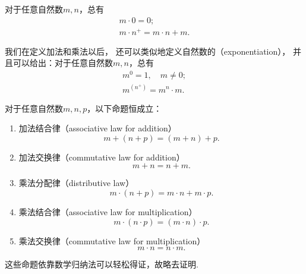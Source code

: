 \begin{theorem}
对于任意自然数\(m,n\)，总有\begin{gather}
	m \cdot 0 = 0;
	\label{equation:集合论.自然数的乘法.性质1} \\%
	m \cdot n^+ = m \cdot n + m.
	\label{equation:集合论.自然数的乘法.性质2}%
\end{gather}
\end{theorem}

我们在定义加法和乘法以后，
还可以类似地定义自然数的（exponentiation），
并且可以给出：对于任意自然数\(m,n\)，总有\begin{gather}
	m^0 = 1, \quad m \neq 0;
	\label{equation:集合论.自然数的乘幂.性质1} \\%
	m^{(n^+)} = m^n \cdot m.
	\label{equation:集合论.自然数的乘幂.性质2}%
\end{gather}

\begin{theorem}
对于任意自然数\(m,n,p\)，以下命题恒成立：
\begin{enumerate}
	\item 加法结合律（associative law for addition）
	\begin{equation}\label{equation:集合论.自然数加法结合律}
		m+(n+p)=(m+n)+p.
	\end{equation}
	\item 加法交换律（commutative law for addition）
	\begin{equation}\label{equation:集合论.自然数加法交换律}
		m+n=n+m.
	\end{equation}
	\item 乘法分配律（distributive law）
	\begin{equation}\label{equation:集合论.自然数乘法分配律}
		m \cdot (n+p) = m \cdot n + m \cdot p.
	\end{equation}
	\item 乘法结合律（associative law for multiplication）
	\begin{equation}\label{equation:集合论.自然数乘法结合律}
		m \cdot (n \cdot p) = (m \cdot n) \cdot p.
	\end{equation}
	\item 乘法交换律（commutative law for multiplication）
	\begin{equation}\label{equation:集合论.自然数乘法交换律}
		m \cdot n = n \cdot m.
	\end{equation}
\end{enumerate}
\end{theorem}
这些命题依靠数学归纳法可以轻松得证，故略去证明.

